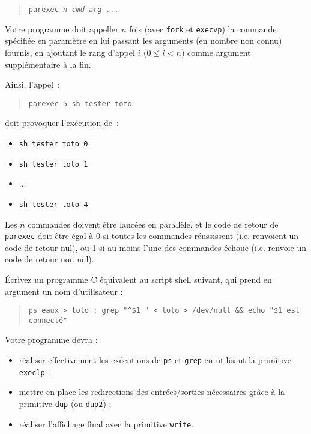 \begin {quote}
    \texttt {parexec \textit {n cmd arg ...}}
\end {quote}

Votre programme doit appeller $n$ fois (avec \texttt {fork} et \texttt
{execvp}) la commande spécifiée en paramètre en lui passant les
arguments (en nombre non connu) fournis, en ajoutant le rang d'appel $i$
($0 \leq i < n$) comme argument supplémentaire à la fin.

Ainsi, l'appel~:

\begin {quote}
    \texttt {parexec 5 sh tester toto}
\end {quote}

doit provoquer l'exécution de~:

\begin {itemize}
    \item \texttt {sh tester toto 0}
    \item \texttt {sh tester toto 1}
    \item ...
    \item \texttt {sh tester toto 4}
\end {itemize}

Les $n$ commandes doivent être lancées en parallèle, et le code de
retour de \texttt {parexec} doit être égal à 0 si toutes les commandes
réussissent (i.e. renvoient un code de retour nul), ou 1 si au moins
l'une des commandes échoue (i.e. renvoie un code de retour non nul).


\question

Écrivez un programme C équivalent au script shell suivant, qui prend
en argument un nom d'utilisateur :

\begin {quote}
    \verb:ps eaux > toto ; grep "^$1 " < toto > /dev/null && echo "$1 est connecté":
\end {quote}

Votre programme devra :

\begin {itemize}
    \item réaliser effectivement les exécutions de \texttt {ps} et
	\texttt {grep} en utilisant la primitive \texttt {execlp} ;

    \item mettre en place les redirections des entrées/sorties
	nécessaires grâce à la primitive \texttt {dup} (ou \texttt
	{dup2}) ;

    \item réaliser l'affichage final avec la primitive \texttt {write}.

\end {itemize}


